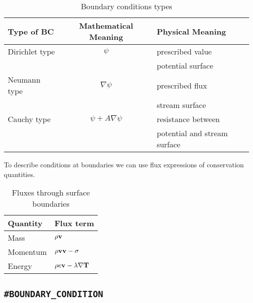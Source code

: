\begin{table}[htb!]
\caption{Boundary conditions types}
\begin{center}
\begin{tabular}{|l|c|l|}
\hline
Type of BC & Mathematical Meaning & Physical Meaning \\
\hline \hline
Dirichlet type  & $\psi$               & prescribed value \\
                &                      & potential surface \\
\hline
Neumann type    & $\nabla\psi$         & prescribed flux \\
                &                      & stream surface \\
\hline
Cauchy type     & $\psi+A\nabla\psi$   & resistance between  \\
                &                      & potential and stream surface \\
\hline
\end{tabular}
\end{center}
\end{table}
  

To describe conditions at boundaries we can use flux expressions
of conservation quantities.

\begin{table}[htb!]
\caption{Fluxes through surface boundaries}
\begin{center}
\begin{tabular}{|l|l|}
\hline
Quantity & Flux term \\
\hline \hline
Mass &   $\rho\bf v$ \\
\hline
Momentum & $\rho{\bf vv}-\sigma$ \\
\hline
Energy   & $\rho e\bf v - \lambda\nabla T$ \\
\hline
\end{tabular}
\end{center}
\end{table}

\subsection{\texttt{\bf\#BOUNDARY\_CONDITION}}


